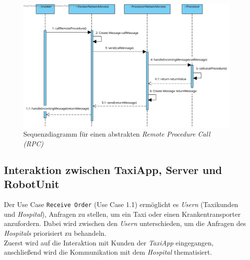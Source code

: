 \begin{figure}[H]
	\centering
	\includegraphics[height=0.85\textwidth, angle=90]{img/2-Entwurf-Communication_RPC}
	\caption{Sequenzdiagramm für einen abstrakten \emph{Remote Procedure Call (RPC)}}
	\label{SequenzDiagrammRPC}
\end{figure}

\subsection*{Interaktion zwischen TaxiApp, Server und RobotUnit}

Der Use Case \texttt{Receive Order} (Use Case 1.1) ermöglicht es \emph{Usern} (Taxikunden und \emph{Hospital}), Anfragen zu stellen, um ein Taxi oder einen Krankentransporter anzufordern. Dabei wird zwischen den \emph{Usern} unterschieden, um die Anfragen des \emph{Hospitals} priorisiert zu behandeln.\\
Zuerst wird auf die Interaktion mit Kunden der \emph{TaxiApp} eingegangen, anschließend wird die Kommunikation mit dem \emph{Hospital} thematisiert. \\ \\

